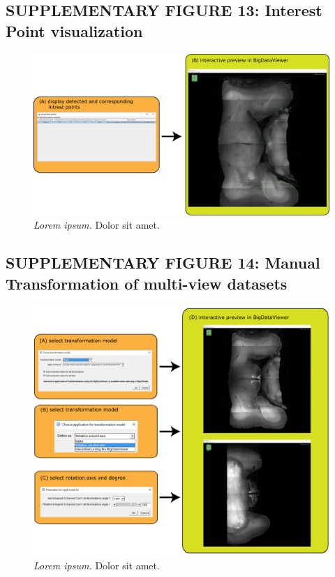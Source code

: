 \documentclass[]{spie}  %
\begin{document}
\pagebreak


\subsection*{SUPPLEMENTARY FIGURE 13: Interest Point visualization}
\vspace{1mm}
\begin{figure}[h!]
\includegraphics[width=\textwidth]{Supp-IntrestPoints.png}
\vspace{-2.0mm}
\caption{\hspace{-0.5mm} \emph{Lorem ipsum.} Dolor sit amet.
}
\label{fig:sup-fig-interest-point}
\end{figure}

\pagebreak


\subsection*{SUPPLEMENTARY FIGURE 14: Manual Transformation of multi-view datasets}
\vspace{1mm}
\begin{figure}[h!]
\includegraphics[width=\textwidth]{Supp-Transformation.png}
\vspace{-2.0mm}
\caption{\hspace{-0.5mm} \emph{Lorem ipsum.} Dolor sit amet.
}
\label{fig:sup-fig-manual-align2}
\end{figure}
\end{document}
